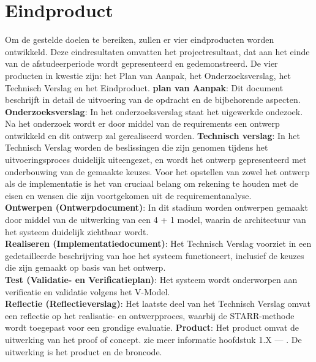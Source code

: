 \section{Eindproduct}
Om de gestelde doelen te bereiken, zullen er vier eindproducten worden ontwikkeld.
Deze eindresultaten omvatten het projectresultaat, dat aan het einde van de afstudeerperiode wordt gepresenteerd en gedemonstreerd.
De vier producten in kwestie zijn: het Plan van Aanpak, het Onderzoeksverslag, het Technisch Verslag en het Eindproduct.
\whitespace
\textbf{plan van Aanpak}: Dit document beschrijft in detail de uitvoering van de opdracht en de bijbehorende aspecten.
\whitespace
\textbf{Onderzoeksverslag}: In het onderzoeksverslag staat het uigewerkde ondezoek.
Na het onderzoek wordt er door middel van de requirements een ontwerp ontwikkeld en dit ontwerp zal gerealiseerd worden.\whitespace
\textbf{Technisch verslag}: In het Technisch Verslag worden de beslissingen die zijn genomen tijdens het uitvoeringsproces duidelijk uiteengezet, en wordt het ontwerp gepresenteerd met onderbouwing van de gemaakte keuzes.
Voor het opstellen van zowel het ontwerp als de implementatie is het van cruciaal belang om rekening te houden met de eisen en wensen die zijn voortgekomen uit de requirementanalyse. \\
\textbf{Ontwerpen (Ontwerpdocument)}: In dit stadium worden ontwerpen gemaakt door middel van de uitwerking van een 4 + 1 model, waarin de architectuur van het systeem duidelijk zichtbaar wordt.\\
\textbf{Realiseren (Implementatiedocument)}: Het Technisch Verslag voorziet in een gedetailleerde beschrijving van hoe het systeem functioneert, inclusief de keuzes die zijn gemaakt op basis van het ontwerp. \\
\textbf{Test (Validatie- en Verificatieplan)}: Het systeem wordt onderworpen aan verificatie en validatie volgens het V-Model.                                                                                             \\
\textbf{Reflectie (Reflectieverslag)}: Het laatste deel van het Technisch Verslag omvat een reflectie op het realisatie- en ontwerpproces, waarbij de STARR-methode wordt toegepast voor een grondige evaluatie.           
\whitespace
\textbf{Product}: Het product omvat de uitwerking van het proof of concept. zie meer informatie hoofdstuk 1.X --- . De uitwerking is het product en de broncode.

